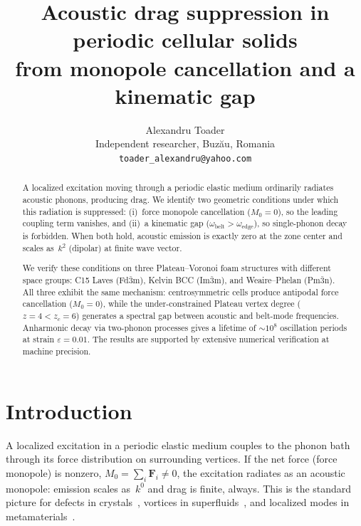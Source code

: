 \documentclass[12pt]{article}
\newcommand{\vF}{\bm{F}}
\newcommand{\oedge}{\omega_{\mathrm{edge}}}
\newcommand{\obelt}{\omega_{\mathrm{belt}}}
\begin{document}
\title{Acoustic drag suppression in periodic cellular solids\\
from monopole cancellation and a kinematic gap}
\author{Alexandru Toader\\
Independent researcher, Buz\u{a}u, Romania\\
\texttt{toader\_alexandru@yahoo.com}}
\date{}

\maketitle

\begin{abstract}
A localized excitation moving through a periodic elastic medium
ordinarily radiates acoustic phonons, producing drag.  We identify
two geometric conditions under which this radiation is suppressed:
(i)~force monopole cancellation ($M_0=0$), so the leading coupling
term vanishes, and (ii)~a kinematic gap ($\obelt > \oedge$), so
single-phonon decay is forbidden.  When both hold, acoustic emission
is exactly zero at the zone center and scales as~$k^2$ (dipolar) at
finite wave vector.

We verify these conditions on three Plateau--Voronoi foam structures
with different space groups: C15 Laves (Fd$\bar{3}$m), Kelvin BCC
(Im$\bar{3}$m), and Weaire--Phelan (Pm$\bar{3}$n).  All three
exhibit the same mechanism: centrosymmetric cells produce antipodal
force cancellation ($M_0=0$), while the under-constrained Plateau
vertex degree ($z=4<z_c=6$) generates a spectral gap between acoustic
and belt-mode frequencies.  Anharmonic decay via two-phonon processes
gives a lifetime of $\sim\!10^8$ oscillation periods at strain
$\varepsilon=0.01$.  The results are supported by extensive numerical
verification at machine precision.
\end{abstract}

\section{Introduction}
\label{sec:intro}

A localized excitation in a periodic elastic medium couples to the
phonon bath through its force distribution on surrounding vertices.
If the net force (force monopole) is nonzero, $M_0 = \sum_i \vF_i
\neq 0$, the excitation radiates as an acoustic monopole: emission
scales as~$k^0$ and drag is finite, always.  This is the standard
picture for defects in crystals~\cite{Eshelby1951}, vortices in
superfluids~\cite{Thouless1996}, and localized modes in
metamaterials~\cite{Matlack2018}.
\end{document}
